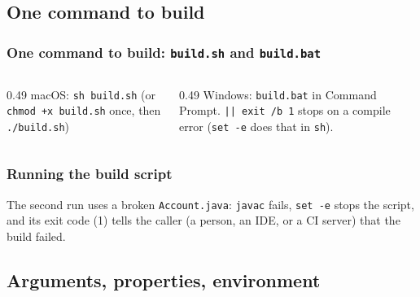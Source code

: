 \documentclass[aspectratio=169,10pt,compress]{beamer}
\newcommand{\cmd}[1]{\texttt{\color{gitred}#1}}
\begin{document}

\subsection[Scripts]{One command to build}




\begin{frame}[t,fragile] \frametitle{One command to build: \texttt{build.sh} and \texttt{build.bat}}
  \begin{columns}[T]
    \begin{column}{0.49\textwidth}
      \small macOS: \cmd{sh build.sh} (or \cmd{chmod +x build.sh} once, then \cmd{./build.sh})
    \end{column}
    \begin{column}{0.49\textwidth}
      \small Windows: \cmd{build.bat} in Command Prompt. \texttt{|| exit /b 1} stops on a compile error
      (\texttt{set -e} does that in \texttt{sh}).
    \end{column}
  \end{columns}
\end{frame}




\begin{frame}[t,fragile] \frametitle{Running the build script}

  \vspace{0.2em}
  \small The second run uses a broken \texttt{Account.java}: \texttt{javac} fails, \texttt{set -e} stops the script, and
  its exit code (1) tells the caller (a person, an IDE, or a CI server) that the build failed.
\end{frame}


\subsection[Config]{Arguments, properties, environment}
\end{document}
